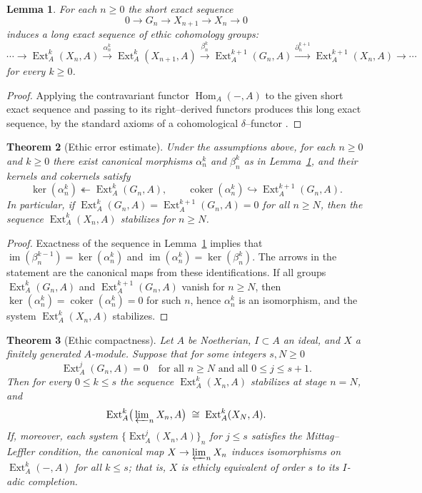 \documentclass[12pt]{article}
\DeclareMathOperator{\im}{im}
\newcommand{\Hom}{\operatorname{Hom}}
\newcommand{\Ext}{\operatorname{Ext}}
\theoremstyle{plain}
\newtheorem{theorem}{Theorem}[section]
\newtheorem{lemma}[theorem]{Lemma}
\theoremstyle{definition}
\theoremstyle{remark}
\numberwithin{equation}{section}
\begin{document}
\begin{lemma}\label{lem:layer-sequence}
For each \(n\ge0\) the short exact sequence
\[
0\longrightarrow G_n\longrightarrow X_{n+1}\longrightarrow X_n\longrightarrow0
\]
induces a long exact sequence of ethic cohomology groups:
\[
\cdots\longrightarrow
\Ext_A^{k}(X_n,A)
\xrightarrow{\alpha_{n}^{k}}
\Ext_A^{k}(X_{n+1},A)
\xrightarrow{\beta_{n}^{k}}
\Ext_A^{k+1}(G_n,A)
\xrightarrow{\partial_{n}^{k+1}}
\Ext_A^{k+1}(X_n,A)
\longrightarrow\cdots
\]
for every \(k\ge0\).
\end{lemma}

\begin{proof}
Applying the contravariant functor \(\Hom_A(-,A)\) to the given short exact sequence
and passing to its right–derived functors produces this long exact sequence,
by the standard axioms of a cohomological \(\delta\)–functor
\cite{Weibel1994}.
\end{proof}

\begin{theorem}[Ethic error estimate]\label{th:error}
Under the assumptions above, for each \(n\ge0\) and \(k\ge0\) there exist canonical morphisms
\(\alpha_{n}^{k}\) and \(\beta_{n}^{k}\) as in Lemma~\ref{lem:layer-sequence},
and their kernels and cokernels satisfy
\[
\ker(\alpha_{n}^{k})\twoheadleftarrow\Ext_A^{k}(G_n,A),
\qquad
\operatorname{coker}(\alpha_{n}^{k})\hookrightarrow\Ext_A^{k+1}(G_n,A).
\]
In particular, if \(\Ext_A^{k}(G_n,A)=\Ext_A^{k+1}(G_n,A)=0\) for all \(n\ge N\),
then the sequence \(\Ext_A^{k}(X_n,A)\) stabilizes for \(n\ge N\).
\end{theorem}

\begin{proof}
Exactness of the sequence in Lemma~\ref{lem:layer-sequence}
implies that \(\im(\beta_{n}^{k-1})=\ker(\alpha_{n}^{k})\)
and \(\im(\alpha_{n}^{k})=\ker(\beta_{n}^{k})\).
The arrows in the statement are the canonical maps from these identifications.
If all groups \(\Ext_A^{k}(G_n,A)\) and \(\Ext_A^{k+1}(G_n,A)\) vanish for \(n\ge N\),
then \(\ker(\alpha_{n}^{k})=\operatorname{coker}(\alpha_{n}^{k})=0\)
for such \(n\), hence \(\alpha_{n}^{k}\) is an isomorphism,
and the system \(\Ext_A^{k}(X_n,A)\) stabilizes.
\end{proof}

\begin{theorem}[Ethic compactness]\label{th:compactness}
Let \(A\) be Noetherian, \(I\subset A\) an ideal, and \(X\) a finitely generated \(A\)-module.
Suppose that for some integers \(s,N\ge0\)
\[
\Ext_A^{j}(G_n,A)=0
\quad\text{for all }n\ge N\text{ and all }0\le j\le s+1.
\]
Then for every \(0\le k\le s\)
the sequence \(\Ext_A^{k}(X_n,A)\) stabilizes at stage \(n=N\), and
\[
\Ext_A^{k}\!\big(\varprojlim\nolimits_{n} X_n,A\big)
\;\cong\;
\Ext_A^{k}(X_N,A).
\]
If, moreover, each system \(\{\Ext_A^{j}(X_n,A)\}_n\) for \(j\le s\) satisfies the
Mittag–Leffler condition, the canonical map \(X\to\varprojlim_n X_n\)
induces isomorphisms on \(\Ext_A^{k}(-,A)\) for all \(k\le s\);
that is, \(X\) is ethicly equivalent of order \(s\) to its \(I\)-adic completion.
\end{theorem}
\end{document}
